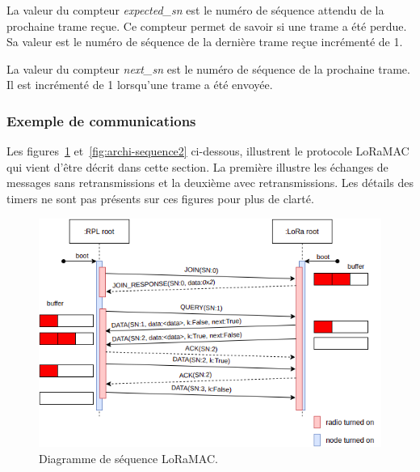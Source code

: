     La valeur du compteur \textit{expected\_sn} est le numéro de séquence attendu de la prochaine trame reçue. Ce compteur permet de savoir si une trame a été perdue. Sa valeur est le numéro de séquence de la dernière trame reçue incrémenté de 1.

    La valeur du compteur \textit{next\_sn} est le numéro de séquence de la prochaine trame. Il est incrémenté de 1 lorsqu'une trame a été envoyée.

\subsubsection*{Exemple de communications}
    Les figures~\ref{fig:archi-sequence1} et~\ref{fig:archi-sequence2} ci-dessous, illustrent le protocole LoRaMAC qui vient d'être décrit dans cette section. La première illustre les échanges de messages sans retransmissions et la deuxième avec retransmissions. Les détails des timers ne sont pas présents sur ces figures pour plus de clarté.
    \begin{figure}[H]
        \centering
        \includegraphics[scale=0.6]{res/pictures/loramac-sequence1.drawio.png}
        \caption{Diagramme de séquence LoRaMAC.}
        \label{fig:archi-sequence1}
    \end{figure}
